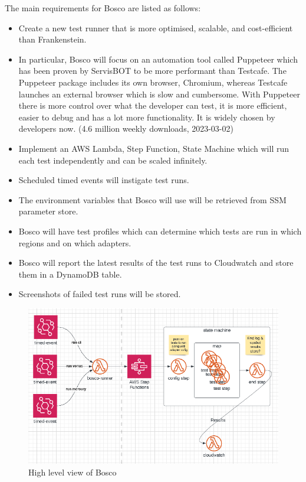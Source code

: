 \documentclass[12pt,a4paper,titlepage]{report}
\begin{document}
The main requirements for Bosco are listed as follows:
\begin{itemize}
  \item Create a new test runner that is more optimised, scalable, and cost-efficient than Frankenstein. 
  \item In particular, Bosco will focus on an automation tool called Puppeteer which has been proven by ServisBOT to be more performant than Testcafe. The Puppeteer package includes its own browser, Chromium, whereas Testcafe launches an external browser which is slow and cumbersome. With Puppeteer there is more control over what the developer can test, it is more efficient, easier to debug and has a lot more functionality. It is widely chosen by developers now. (4.6 million weekly downloads, 2023-03-02) \cite{Puppeteer}
  \item Implement an AWS Lambda, Step Function, State Machine which will run each test independently and can be scaled infinitely.
  \item Scheduled timed events will instigate test runs.
  \item The environment variables that Bosco will use will be retrieved from \ac{SSM} parameter store. 
  \item Bosco will have test profiles which can determine which tests are run in which regions and on which adapters. 
  \item Bosco will report the latest results of the test runs to Cloudwatch and store them in a DynamoDB table.
  \item Screenshots of failed test runs will be stored. 
\end{itemize}

\begin{figure}[ht]
 \centering
 \includegraphics[width=\textwidth,height=\textheight,keepaspectratio]{./diagrams/bosco_high_level.png}
 \caption{High level view of Bosco}
\end{figure}
\end{document}
